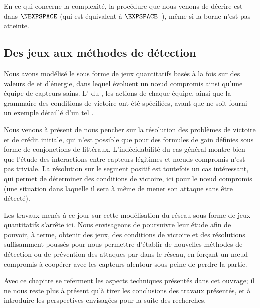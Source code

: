 En ce qui concerne la complexité, la procédure que nous venons de décrire est dans $\NEXPSPACE$ (qui est équivalent à $\EXPSPACE$~\cite[Chap.~20]{papadimitriou94}), même si la borne n'est pas atteinte.

\subsection{Des jeux aux méthodes de détection}

Nous avons modélisé le \rcsf sous forme de jeux quantitatifs basés à la fois sur des valeurs de  et d'énergie, dans lequel évoluent un nœud compromis ainsi qu'une équipe de capteurs sains.
L' du , les actions de chaque équipe, ainsi que la grammaire des conditions de victoire ont été spécifiées, avant que ne soit fourni un exemple détaillé d'un tel .

Nous venons à présent de nous pencher sur la résolution des problèmes de victoire et de crédit initiale, qui n'est possible que pour des formules de gain définies sous forme de conjonctions de littéraux.
L'indécidabilité du cas général montre bien que l'étude des interactions entre capteurs légitimes et nœuds compromis n'est pas triviale.
La résolution sur le segment positif est toutefois un cas intéressant, qui permet de déterminer des conditions de victoire, ici pour le nœud compromis (\cad une situation dans laquelle il sera à même de mener son attaque sans être détecté).

Les travaux menés à ce jour sur cette modélisation du réseau sous forme de jeux quantitatifs s'arrête ici.
Nous envisageons de poursuivre leur étude afin de pouvoir, à terme, obtenir des jeux, des conditions de victoire et des résolutions suffisamment poussés pour nous permettre d'établir de nouvelles méthodes de détection ou de prévention des attaques par \dds dans le réseau, en forçant un nœud compromis à coopérer avec les capteurs alentour sous peine de perdre la partie.

Avec ce chapitre se referment les aspects techniques présentés dans cet ouvrage; il ne nous reste plus à présent qu'à tirer les conclusions des travaux présentés, et à introduire les perspectives envisagées pour la suite des recherches.
